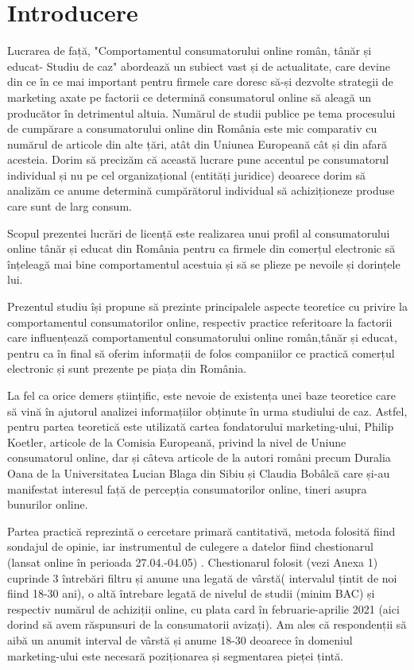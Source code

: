 \documentclass[a4paper, 12pt]{article}
\begin{document}
 
	\section*{Introducere}
	
	\quad\quad Lucrarea de față, "Comportamentul consumatorului online român, tânăr și educat- Studiu de caz" abordează un subiect vast și de actualitate, care devine din ce în ce mai important pentru firmele care doresc să-și dezvolte strategii de marketing axate pe factorii ce determină consumatorul online să aleagă un producător în detrimentul altuia. Numărul de studii publice pe tema procesului de cumpărare a consumatorului online din România este mic comparativ cu numărul de articole din alte țări, atât din Uniunea Europeană cât și din afară acesteia. Dorim să precizăm că această lucrare pune accentul pe consumatorul  individual și nu pe cel organizațional (entități juridice) deoarece dorim să analizăm ce anume determină cumpărătorul individual să achiziționeze produse care sunt de larg consum.
	
	\quad Scopul prezentei lucrări de licență este realizarea unui profil al consumatorului online tânăr și educat din România pentru ca firmele din comerțul electronic să înțeleagă mai bine comportamentul acestuia și să se plieze pe nevoile și dorințele lui.
	
	\quad Prezentul studiu își propune să prezinte principalele aspecte teoretice cu privire la comportamentul consumatorilor online, respectiv practice referitoare la factorii care influențează comportamentul consumatorului online român,tânăr și educat, pentru ca în final să oferim informații de folos companiilor ce practică comerțul electronic și sunt prezente pe piața din România.
	
	\quad La fel ca orice demers științific, este nevoie de existența unei baze teoretice care să vină în ajutorul analizei informațiilor obținute în urma studiului de caz. Astfel, pentru partea teoretică este utilizată cartea fondatorului marketing-ului, Philip Koetler, articole de la Comisia Europeană, privind la nivel de Uniune consumatorul online, dar și câteva articole de la autori români precum Duralia Oana de la Universitatea Lucian Blaga din Sibiu și Claudia Bobâlcă care și-au manifestat interesul față de percepția consumatorilor online, tineri asupra bunurilor online. 
	
	\quad Partea practică reprezintă o cercetare primară cantitativă, metoda folosită fiind sondajul de opinie, iar instrumentul de culegere a datelor fiind chestionarul (lansat online în perioada 27.04.-04.05) . Chestionarul folosit (vezi Anexa 1) cuprinde 3 întrebări filtru și anume una legată de vârstă( intervalul țintit de noi fiind 18-30 ani), o altă întrebare legată de nivelul de studii (minim BAC) și respectiv numărul de achiziții online, cu plata card în februarie-aprilie 2021 (aici dorind să avem răspunsuri de la consumatorii avizați). Am ales că respondenții să aibă un anumit interval de vârstă și anume 18-30 deoarece în domeniul marketing-ului este necesară poziționarea și segmentarea pieței țintă.
	
\end{document}
